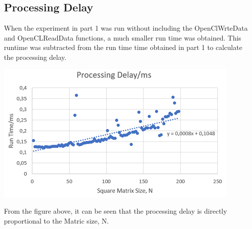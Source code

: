 \subsection{Processing Delay}
When the experiment in part 1 was run without including the OpenClWrteData and OpenCLReadData functions, a much smaller run time was obtained. This runtime was subtracted from the run time time obtained in part 1 to calculate the processing delay. 

\vspace{2mm}
\includegraphics{Figures/processing_delay.PNG}

From the figure above, it can be seen that the processing delay is directly proportional to the Matric size, N.
\\
\vspace{2mm}
